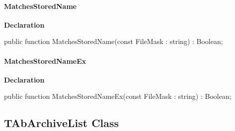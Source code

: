 \documentclass{report}
\newif\ifpdf
\begin{document}
\paragraph*{MatchesStoredName}\hspace*{\fill}

\label{AbArcTyp.TAbArchiveItem-MatchesStoredName}
\begin{list}{}{
\setlength{\itemindent}{0cm}
\setlength{\listparindent}{0cm}
\setlength{\leftmargin}{\evensidemargin}
\addtolength{\leftmargin}{\tmplength}
\settowidth{\labelsep}{X}
\addtolength{\leftmargin}{\labelsep}
\setlength{\labelwidth}{\tmplength}
}
\item[\textbf{Declaration}\hfill]
\ifpdf
\begin{flushleft}
\fi
\begin{ttfamily}
public function MatchesStoredName(const FileMask : string) : Boolean;\end{ttfamily}

\ifpdf
\end{flushleft}
\fi

\end{list}
\paragraph*{MatchesStoredNameEx}\hspace*{\fill}

\label{AbArcTyp.TAbArchiveItem-MatchesStoredNameEx}
\begin{list}{}{
\setlength{\itemindent}{0cm}
\setlength{\listparindent}{0cm}
\setlength{\leftmargin}{\evensidemargin}
\addtolength{\leftmargin}{\tmplength}
\settowidth{\labelsep}{X}
\addtolength{\leftmargin}{\labelsep}
\setlength{\labelwidth}{\tmplength}
}
\item[\textbf{Declaration}\hfill]
\ifpdf
\begin{flushleft}
\fi
\begin{ttfamily}
public function MatchesStoredNameEx(const FileMask : string) : Boolean;\end{ttfamily}

\ifpdf
\end{flushleft}
\fi

\end{list}
\ifpdf
\subsection*{\large{\textbf{TAbArchiveList Class}}\normalsize\hspace{1ex}\hrulefill}
\else
\end{document}
